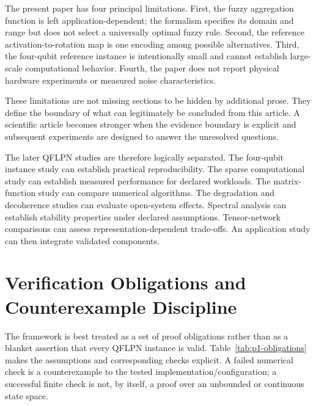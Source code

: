 \documentclass[final,3p,times]{elsarticle}
\begin{document}
The present paper has four principal limitations. First, the fuzzy aggregation function is left application-dependent; the formalism specifies its domain and range but does not select a universally optimal fuzzy rule. Second, the reference activation-to-rotation map is one encoding among possible alternatives. Third, the four-qubit reference instance is intentionally small and cannot establish large-scale computational behavior. Fourth, the paper does not report physical hardware experiments or measured noise characteristics.

These limitations are not missing sections to be hidden by additional prose. They define the boundary of what can legitimately be concluded from this article. A scientific article becomes stronger when the evidence boundary is explicit and subsequent experiments are designed to answer the unresolved questions.

The later QFLPN studies are therefore logically separated. The four-qubit instance study can establish practical reproducibility. The sparse computational study can establish measured performance for declared workloads. The matrix-function study can compare numerical algorithms. The degradation and decoherence studies can evaluate open-system effects. Spectral analysis can establish stability properties under declared assumptions. Tensor-network comparisons can assess representation-dependent trade-offs. An application study can then integrate validated components.

\section{Verification Obligations and Counterexample Discipline}

The framework is best treated as a set of proof obligations rather than as a blanket assertion that every QFLPN instance is valid. Table~\ref{tab:p1-obligations} makes the assumptions and corresponding checks explicit. A failed numerical check is a counterexample to the tested implementation/configuration; a successful finite check is not, by itself, a proof over an unbounded or continuous state space.
\end{document}
